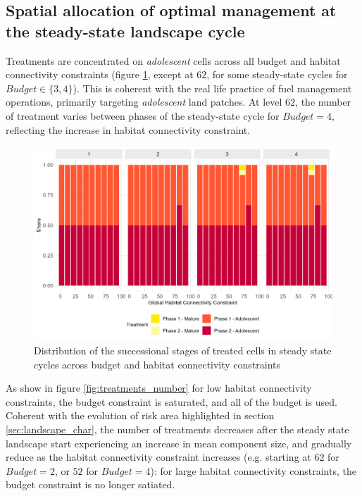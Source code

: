 
\FloatBarrier
\subsection{Spatial allocation of optimal management at the steady-state landscape cycle}

Treatments are concentrated on \textit{adolescent} cells across all budget and habitat connectivity constraints (figure \ref{fig:treatments_time}, except at $62$, for some steady-state cycles for $Budget \in \{3,4\}$). This is coherent with the real life practice of fuel management operations, primarily targeting \textit{adolescent} land patches. At level $62$, the number of treatment varies between phases of the steady-state cycle for $Budget=4$, reflecting the increase in habitat connectivity constraint. 

\begin{figure}
         \centering
         \includegraphics[width=.8\textwidth]{figures/wildland/treatment_time.jpg}
    		  \caption{Distribution of the successional stages of treated cells in steady state cycles across budget and habitat connectivity constraints}
         \label{fig:treatments_time}
\end{figure}

As show in figure \ref{fig:treatments_number} for low habitat connectivity constraints, the budget constraint is saturated, and all of the budget is used. Coherent with the evolution of risk area highlighted in section \ref{sec:landscape_char}, the number of treatments decreases after the steady state landscape start experiencing an increase in mean component size, and gradually reduce as the habitat connectivity constraint increases (e.g. starting at $62$ for $Budget = 2$, or $52$ for $Budget = 4$): for large habitat connectivity constraints, the budget constraint is no longer satiated. 
 
